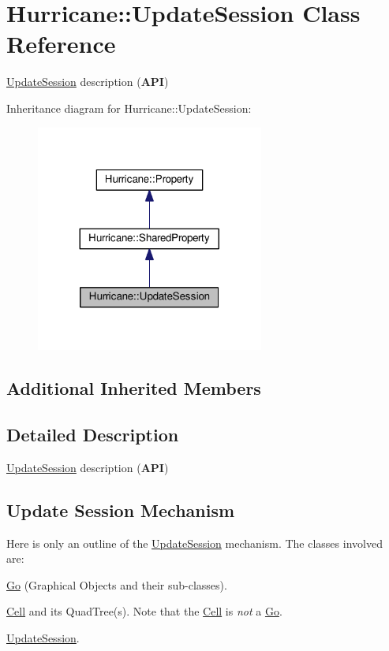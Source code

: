 \hypertarget{classHurricane_1_1UpdateSession}{}\section{Hurricane\+:\+:Update\+Session Class Reference}
\label{classHurricane_1_1UpdateSession}


\hyperlink{classHurricane_1_1UpdateSession}{Update\+Session} description ({\bfseries A\+PI})  




Inheritance diagram for Hurricane\+:\+:Update\+Session\+:\nopagebreak
\begin{figure}[H]
\begin{center}
\leavevmode
\includegraphics[width=212pt]{classHurricane_1_1UpdateSession__inherit__graph}
\end{center}
\end{figure}
\subsection*{Additional Inherited Members}


\subsection{Detailed Description}
\hyperlink{classHurricane_1_1UpdateSession}{Update\+Session} description ({\bfseries A\+PI}) 

\hypertarget{classHurricane_1_1UpdateSession_secUpdateSessionMechanism}{}\subsection{Update Session Mechanism}\label{classHurricane_1_1UpdateSession_secUpdateSessionMechanism}
Here is only an outline of the \hyperlink{classHurricane_1_1UpdateSession}{Update\+Session} mechanism. The classes involved are\+:
\begin{DoxyItemize}
\item \hyperlink{classHurricane_1_1Go}{Go} (Graphical Objects and their sub-\/classes).
\item \hyperlink{classHurricane_1_1Cell}{Cell} and it\textquotesingle{}s Quad\+Tree(s). Note that the \hyperlink{classHurricane_1_1Cell}{Cell} is {\itshape not} a \hyperlink{classHurricane_1_1Go}{Go}.
\item \hyperlink{classHurricane_1_1UpdateSession}{Update\+Session}.
\end{DoxyItemize}

